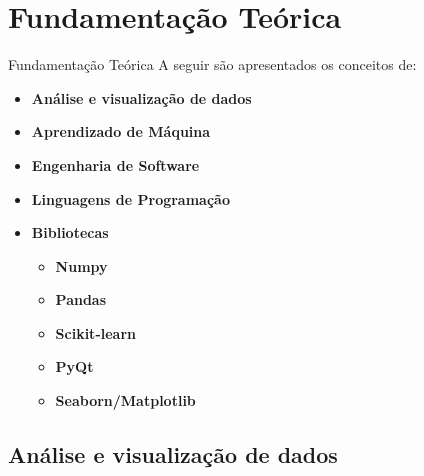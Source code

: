 

\section{Fundamentação Teórica}
\label{sec:fundamentacao-teorica}

\begin{frame}{Fundamentação Teórica}
	A seguir são apresentados os conceitos de:

	\bigskip

	\begin{itemize}
		\item \textbf{Análise e visualização de dados}
		\item \textbf{Aprendizado de Máquina}
		\item \textbf{Engenharia de Software}
		\item \textbf{Linguagens de Programação}
		\item \textbf{Bibliotecas}
		      \begin{itemize}
			      \item \textbf{Numpy}
			      \item \textbf{Pandas}
			      \item \textbf{Scikit-learn}
			      \item  \textbf{PyQt}
			      \item \textbf{Seaborn/Matplotlib}
		      \end{itemize}
	\end{itemize}

\end{frame}

\subsection{Análise e visualização de dados}
\label{subsec:analise-e-visualizacao-de-dados}

